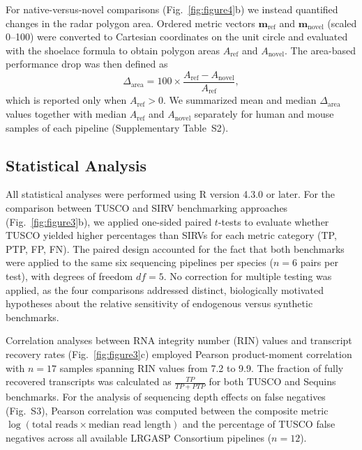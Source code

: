 \documentclass[pdflatex,sn-nature]{sn-jnl}%
\begin{document}
For native-versus-novel comparisons (Fig.~\ref{fig:figure4}b) we instead quantified changes in the radar polygon area. Ordered metric vectors $\boldsymbol{m}_{\mathrm{ref}}$ and $\boldsymbol{m}_{\mathrm{novel}}$ (scaled 0--100) were converted to Cartesian coordinates on the unit circle and evaluated with the shoelace formula to obtain polygon areas $A_{\mathrm{ref}}$ and $A_{\mathrm{novel}}$. The area-based performance drop was then defined as
\begin{equation}
\Delta_{\mathrm{area}} = 100 \times \frac{A_{\mathrm{ref}} - A_{\mathrm{novel}}}{A_{\mathrm{ref}}},
\end{equation}
which is reported only when $A_{\mathrm{ref}} > 0$. We summarized mean and median $\Delta_{\mathrm{area}}$ values together with median $A_{\mathrm{ref}}$ and $A_{\mathrm{novel}}$ separately for human and mouse samples of each pipeline (Supplementary Table~S2).

\subsection{Statistical Analysis}

All statistical analyses were performed using R version 4.3.0 or later. For the comparison between TUSCO and SIRV benchmarking approaches (Fig.~\ref{fig:figure3}b), we applied one-sided paired $t$-tests to evaluate whether TUSCO yielded higher percentages than SIRVs for each metric category (TP, PTP, FP, FN). The paired design accounted for the fact that both benchmarks were applied to the same six sequencing pipelines per species ($n = 6$ pairs per test), with degrees of freedom $df = 5$. No correction for multiple testing was applied, as the four comparisons addressed distinct, biologically motivated hypotheses about the relative sensitivity of endogenous versus synthetic benchmarks.

Correlation analyses between RNA integrity number (RIN) values and transcript recovery rates (Fig.~\ref{fig:figure3}c) employed Pearson product-moment correlation with $n = 17$ samples spanning RIN values from 7.2 to 9.9. The fraction of fully recovered transcripts was calculated as $\frac{TP}{TP + PTP}$ for both TUSCO and Sequins benchmarks. For the analysis of sequencing depth effects on false negatives (Fig.~S3), Pearson correlation was computed between the composite metric $\log\!\left(\text{total reads} \times \text{median read length}\right)$ and the percentage of TUSCO false negatives across all available LRGASP Consortium pipelines ($n = 12$).
\end{document}
